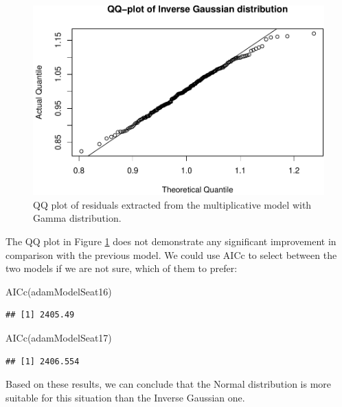 \documentclass[
]{book}
\newenvironment{Shaded}{\begin{snugshade}}{\end{snugshade}}
\newcommand{\FunctionTok}[1]{\textcolor[rgb]{0.00,0.00,0.00}{#1}}
\newcommand{\NormalTok}[1]{#1}
\theoremstyle{definition}
\theoremstyle{definition}
\theoremstyle{definition}
\theoremstyle{definition}
\theoremstyle{remark}
\begin{document}
\begin{figure}
\centering
\includegraphics{Svetunkov--2022----ADAM_files/figure-latex/adamModelSeat17QQ-1.pdf}
\caption{\label{fig:adamModelSeat17QQ}QQ plot of residuals extracted from the multiplicative model with Gamma distribution.}
\end{figure}

The QQ plot in Figure \ref{fig:adamModelSeat17QQ} does not demonstrate any significant improvement in comparison with the previous model. We could use AICc to select between the two models if we are not sure, which of them to prefer:

\begin{Shaded}
\begin{Highlighting}[]
\FunctionTok{AICc}\NormalTok{(adamModelSeat16)}
\end{Highlighting}
\end{Shaded}

\begin{verbatim}
## [1] 2405.49
\end{verbatim}

\begin{Shaded}
\begin{Highlighting}[]
\FunctionTok{AICc}\NormalTok{(adamModelSeat17)}
\end{Highlighting}
\end{Shaded}

\begin{verbatim}
## [1] 2406.554
\end{verbatim}

Based on these results, we can conclude that the Normal distribution is more suitable for this situation than the Inverse Gaussian one.
\end{document}
